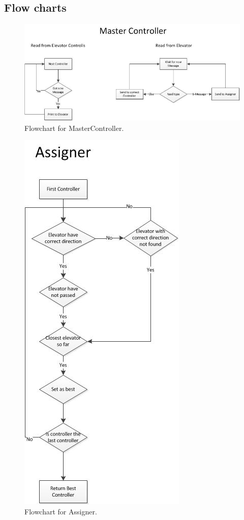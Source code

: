 \begin{appendix}
\section{Flow charts}
\label{app:charts}
\begin{figure}[h!]
\begin{center}
\includegraphics[scale=0.8]{FlowChart/MasterC.jpg}
\caption{Flowchart for MasterController.}
\label{chart:master}
\end{center}
\end{figure}

\begin{figure}[h!]
\begin{center}
\includegraphics{FlowChart/Assigner.jpg}
\caption{Flowchart for Assigner.}
\label{chart:assigner}
\end{center}
\end{figure}


\end{appendix}
